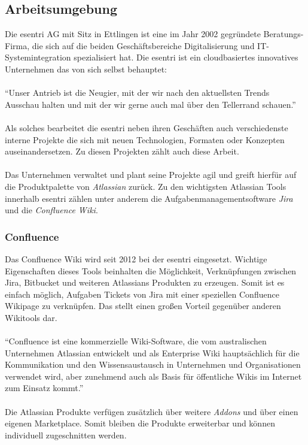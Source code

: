 \documentclass[a4paper,12pt]{scrartcl}
\begin{document}
\subsection{Arbeitsumgebung}
Die esentri AG mit Sitz in Ettlingen ist eine im Jahr 2002 gegründete Beratungs-Firma, die sich auf die beiden Geschäftsbereiche Digitalisierung und IT-Systemintegration spezialisiert hat. Die esentri ist ein cloudbasiertes innovatives Unternehmen das von sich selbst behauptet:
\\\\
\enquote{Unser Antrieb ist die Neugier, mit der wir nach den aktuellsten Trends Ausschau halten und mit der wir gerne auch mal über den Tellerrand schauen.} \footnotemark
{}
\\\\
Als solches bearbeitet die esentri neben ihren Geschäften auch verschiedenste interne Projekte die sich mit neuen Technologien, Formaten oder Konzepten auseinandersetzen. Zu diesen Projekten zählt auch diese Arbeit. 
\\\\
Das Unternehmen verwaltet und plant seine Projekte agil und greift hierfür auf die Produktpalette von \textit{Atlassian} zurück. Zu den wichtigsten Atlassian Tools innerhalb esentri zählen unter anderem die Aufgabenmanagementsoftware \textit{Jira} und die \textit{Confluence Wiki}.

\subsubsection{Confluence}
Das Confluence Wiki wird seit 2012 bei der esentri eingesetzt. Wichtige Eigenschaften dieses Tools beinhalten die Möglichkeit, Verknüpfungen zwischen Jira, Bitbucket und weiteren Atlassians Produkten zu erzeugen. Somit ist es einfach möglich, Aufgaben Tickets von Jira mit einer speziellen Confluence Wikipage zu verknüpfen. Das stellt einen großen Vorteil gegenüber anderen Wikitools dar.
\\\\
\enquote{Confluence ist eine kommerzielle Wiki-Software, die vom australischen Unternehmen Atlassian entwickelt und als Enterprise Wiki hauptsächlich für die Kommunikation und den Wissensaustausch in Unternehmen und Organisationen verwendet wird, aber zunehmend auch als Basis für öffentliche Wikis im Internet zum Einsatz kommt.} \footnotemark
{}
\\\\
Die Atlassian Produkte verfügen zusätzlich über weitere \textit{Addons} und über einen eigenen Marketplace. Somit bleiben die Produkte erweiterbar und können individuell zugeschnitten werden.
\end{document}
